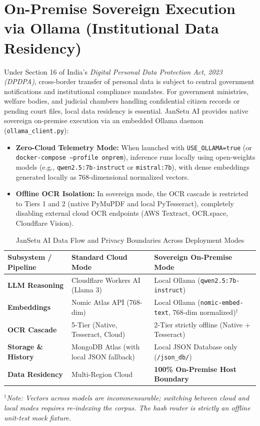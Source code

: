 \documentclass[12pt,a4paper,oneside]{report}
\begin{document}
\section{On-Premise Sovereign Execution via Ollama (Institutional Data Residency)}
Under Section 16 of India's \textit{Digital Personal Data Protection Act, 2023 (DPDPA)}, cross-border transfer of personal data is subject to central government notifications and institutional compliance mandates. For government ministries, welfare bodies, and judicial chambers handling confidential citizen records or pending court files, local data residency is essential. JanSetu AI provides native sovereign on-premise execution via an embedded Ollama daemon (\texttt{ollama\_client.py}):
\begin{itemize}[itemsep=2pt]
    \item \textbf{Zero-Cloud Telemetry Mode:} When launched with \texttt{USE\_OLLAMA=true} (or \texttt{docker-compose --profile onprem}), inference runs locally using open-weights models (e.g., \texttt{qwen2.5:7b-instruct} or \texttt{mistral:7b}), with dense embeddings generated locally as 768-dimensional normalized vectors.
    \item \textbf{Offline OCR Isolation:} In sovereign mode, the OCR cascade is restricted to Tiers 1 and 2 (native PyMuPDF and local PyTesseract), completely disabling external cloud OCR endpoints (AWS Textract, OCR.space, Cloudflare Vision).
\end{itemize}

\begin{table}[H]
\centering
\small
\caption{JanSetu AI Data Flow and Privacy Boundaries Across Deployment Modes}
\label{tab:data_flow_privacy}
\begin{tabularx}{\textwidth}{lXX}
\toprule
\textbf{Subsystem / Pipeline} & \textbf{Standard Cloud Mode} & \textbf{Sovereign On-Premise Mode} \\
\midrule
\textbf{LLM Reasoning} & Cloudflare Workers AI (Llama 3) & Local Ollama (\texttt{qwen2.5:7b-instruct}) \\
\textbf{Embeddings} & Nomic Atlas API (768-dim) & Local Ollama (\texttt{nomic-embed-text}, 768-dim normalized)$^\dagger$ \\
\textbf{OCR Cascade} & 5-Tier (Native, Tesseract, Cloud) & 2-Tier strictly offline (Native + Tesseract) \\
\textbf{Storage \& History} & MongoDB Atlas (with local JSON fallback) & Local JSON Database only (\texttt{/json\_db/}) \\
\textbf{Data Residency} & Multi-Region Cloud & \textbf{100\% On-Premise Host Boundary} \\
\bottomrule
\end{tabularx}
\vspace{2pt}
\noindent\footnotesize{$^\dagger$\textit{Note: Vectors across models are incommensurable; switching between cloud and local modes requires re-indexing the corpus. The hash router is strictly an offline unit-test mock fixture.}}
\end{table}
\end{document}
